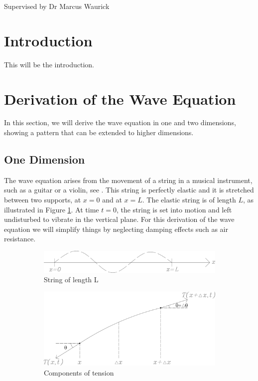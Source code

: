 \documentclass[a4paper, 12pt]{article}
\numberwithin{equation}{section}
\begin{document}
    \vspace*{5cm}
    Supervised by Dr Marcus Waurick
    \newpage
    \normalsize
    \tableofcontents
    \newpage
    
    \section{Introduction}
    This will be the introduction.
    
    \section{Derivation of the Wave Equation}
    In this section, we will derive the wave equation in one and two dimensions, showing a pattern that 
can be extended to higher dimensions.

\subsection{One Dimension}
The wave equation arises from the movement of a string in a musical instrument, such as a guitar or a violin, see
\cite{BoyDiP}. This string is perfectly elastic and
it is stretched between two supports, at $x=0$ and at $x=L$. The elastic string is of length $L$, as
illustrated in Figure \ref{fig:1a}. At time $t=0$, the string is set into motion and left undisturbed to vibrate in the
vertical plane. For this derivation of the wave equation we will simplify things by neglecting damping 
effects such as air resistance.

\begin{figure}[h]
    \begin{subfigure}[t]{0.5\textwidth} 
        \includegraphics[width=0.9\linewidth]{images/grafic-1.png} 
        \caption{String of length L}
        \label{fig:1a}
    \end{subfigure}
    \begin{subfigure}[t]{0.5\textwidth}
        \includegraphics[width=0.9\linewidth]{images/grafic-2.png}
        \caption{Components of tension}
        \label{fig:1b}
    \end{subfigure}     
\caption{}
\label{fig:1}
\end{figure}
\end{document}
